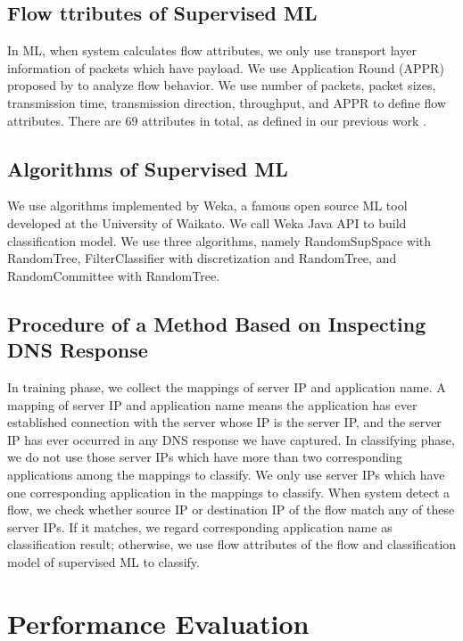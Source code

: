 \documentclass[journal]{IEEEtran}
\begin{document}
\subsection{Flow ttributes of Supervised ML}
In ML, when system calculates flow attributes, we only use transport layer information of packets which have payload.
We use Application Round (APPR) proposed by \cite{classfication-cloud} to analyze flow behavior.
We use number of packets, packet sizes, transmission time,
transmission direction, throughput, and APPR to define flow attributes.
There are 69 attributes in total, as defined in our previous work \cite{Chia-Chin-master}.



\subsection{Algorithms of Supervised ML}
We use algorithms implemented by Weka, a famous open source ML tool developed at the University of Waikato.
We call Weka Java API to build classification model.
We use three algorithms, namely RandomSupSpace with RandomTree\cite{TinKamHo1998},
FilterClassifier with discretization and RandomTree, and RandomCommittee with RandomTree.



\subsection{Procedure of a Method Based on Inspecting DNS Response}
In training phase, we collect the mappings of server IP and application name.
A mapping of server IP and application name means the application has ever established connection
with the server whose IP is the server IP, and the server IP has ever occurred in any DNS response we have captured.
In classifying phase, we do not use those server IPs which have more than two corresponding applications among the mappings to classify.
We only use server IPs which have one corresponding application in the mappings to classify.
When system detect a flow, we check whether source IP or destination IP of the flow match any of these server IPs.
If it matches, we regard corresponding application name as classification result;
otherwise, we use flow attributes of the flow and classification model of supervised ML to classify.





\section{Performance Evaluation}
\end{document}
